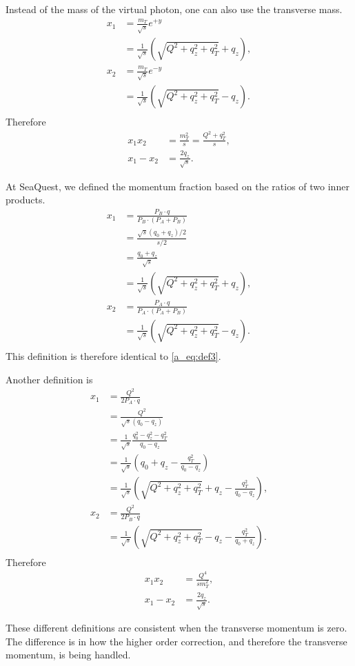 \documentclass[../main.tex]{subfiles}
\begin{document}
Instead of the mass of the virtual photon, one can also use the transverse mass.
\begin{equation}
	\begin{split}
		x_1 &= \frac{m_T}{\sqrt{s}} e^{+y}\\
		&=\frac{1}{\sqrt{s}}\left(\sqrt{Q^2+q_z^2+q_T^2}+q_z\right),\\
		x_2 &= \frac{m_T}{\sqrt{s}} e^{-y}\\
		&= \frac{1}{\sqrt{s}}\left(\sqrt{Q^2+q_z^2+q_T^2}-q_z\right).\\
	\end{split}
	\label{a_eq:def3}
\end{equation}
Therefore
\begin{equation}
	\begin{split}
		x_1x_2 &= \frac{m_T^2}{s} = \frac{Q^2+q_T^2}{s},\\
		x_1-x_2 &= \frac{2q_z}{\sqrt{s}}.
	\end{split}
\end{equation}


At SeaQuest, we defined the momentum fraction based on the ratios of two inner products.
\begin{equation}
	\begin{split}
		x_1 &= \frac{P_B\cdot q}{P_B\cdot (P_A+P_B)}\\
		&= \frac{\sqrt{s}(q_0+q_z)/2}{s/2}\\
		&= \frac{q_0+q_z}{\sqrt{s}}\\
		&= \frac{1}{\sqrt{s}}\left(\sqrt{Q^2+q_z^2+q_T^2}+q_z\right),\\
		x_2 &= \frac{P_A\cdot q}{P_A\cdot (P_A+P_B)}\\
		&= \frac{1}{\sqrt{s}}\left(\sqrt{Q^2+q_z^2+q_T^2}-q_z\right).\\
	\end{split}
\end{equation}
This definition is therefore identical to \cref{a_eq:def3}.

Another definition is
\begin{equation}
	\begin{split}
		x_1 &= \frac{Q^2}{2P_A \cdot q}\\
		&= \frac{Q^2}{\sqrt{s}(q_0-q_z)}\\
		&= \frac{1}{\sqrt{s}}\frac{q_0^2 -q_z^2 -q_T^2}{q_0-q_z} \\
		&= \frac{1}{\sqrt{s}} \left(q_0+q_z -\frac{q_T^2}{q_0-q_z}\right)\\
		&= \frac{1}{\sqrt{s}}\left(\sqrt{Q^2+q_z^2+q_T^2}+q_z -\frac{q_T^2}{q_0-q_z}\right),\\
		x_2 &= \frac{Q^2}{2P_B \cdot q}\\
		&= \frac{1}{\sqrt{s}}\left(\sqrt{Q^2+q_z^2+q_T^2}-q_z -\frac{q_T^2}{q_0+q_z}\right).\\
	\end{split}
\end{equation}
Therefore
\begin{equation}
	\begin{split}
		x_1x_2 &= \frac{Q^4}{s m_T^2}, \\
		x_1-x_2 &= \frac{2q_z}{\sqrt{s}}.
	\end{split}
\end{equation}

These different definitions are consistent when the transverse momentum is zero.
The difference is in how the higher order correction, and therefore the transverse momentum,
is being handled.
\end{document}
